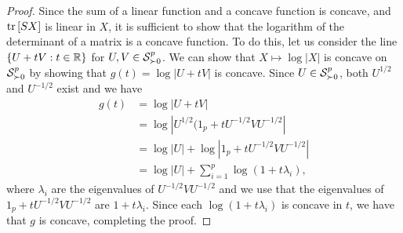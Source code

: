 \begin{proof}
    Since the sum of a linear function and a concave function is concave, and $\trB{SX}$ is linear in $X$, it is sufficient to show that the logarithm of the determinant of a matrix is a concave function. To do this, let us consider the line $\eset{ U + tV : t \in \R }$ for $U, V \in \S^p_{\succ 0}$. We can show that $X \mapsto \log |X|$ is concave on $\S^p_{\succ 0}$ by showing that $g(t) = \log |U + tV|$ is concave. Since $U \in \S^p_{\succ 0}$, both $U^{1/2}$ and $U^{-1/2}$ exist and we have 
    \begin{align*}
        g(t)
        &= \log |U + tV| \\
        &= \log |U^{1/2}(1_p + tU^{-1/2}VU^{-1/2}|\\
        &= \log |U| + \log |1_p + tU^{-1/2}VU^{-1/2}|\\
        &= \log |U| + \sum_{i=1}^p \log (1 + t\lambda_i),
    \end{align*}
    where $\lambda_i$ are the eigenvalues of $U^{-1/2}VU^{-1/2}$ and we use that the eigenvalues of $1_p + tU^{-1/2}VU^{-1/2}$ are $1 + t\lambda_i$. Since each $\log (1 + t\lambda_i)$ is concave in $t$, we have that $g$ is concave, completing the proof.
\end{proof}

